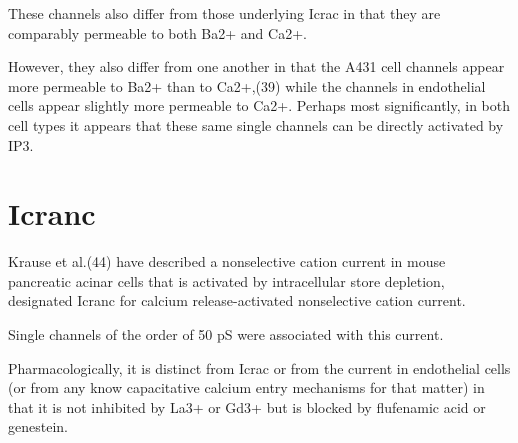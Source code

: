 These channels also differ from those
underlying Icrac in that they are comparably permeable to both
Ba2+ and Ca2+.


However, they also differ from one another in that the A431 cell channels appear
more permeable to Ba2+ than to Ca2+,(39) while the channels in endothelial cells
appear slightly more permeable to Ca2+.
Perhaps most significantly, in both cell types it appears that these same single
channels can be directly activated by IP3.

\section{Icranc}

Krause et al.(44) have described a nonselective
cation current in mouse pancreatic acinar cells that is activated
by intracellular store depletion, designated Icranc for
calcium release-activated nonselective cation current.

Single channels of the order of 50 pS were associated with this current.

Pharmacologically, it is distinct from Icrac or from the current in endothelial
cells (or from any know capacitative calcium entry mechanisms for that matter)
in that it is not inhibited by La3+ or Gd3+ but is blocked by flufenamic acid or
genestein.











